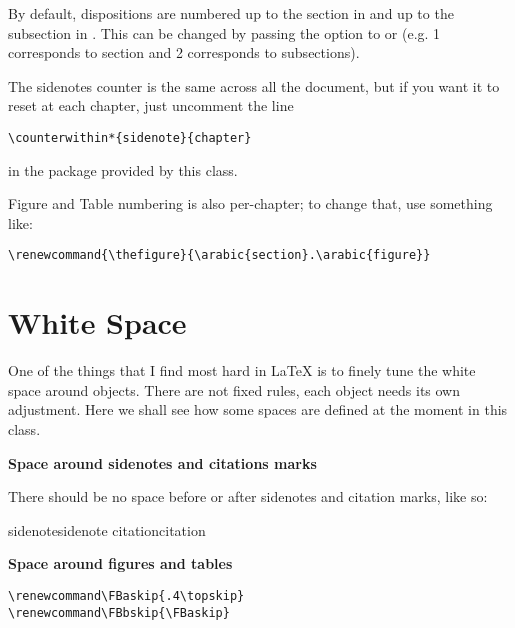 By default, dispositions are numbered up to the section in 
and up to the subsection in . This can be changed by
passing the option  to or
 (e.g. 1 corresponds to section and 2 corresponds to
subsections).

The sidenotes counter is the same across all the document, but if you 
want it to reset at each chapter, just uncomment the line

\begin{lstlisting}[style=kaolstplain]
\counterwithin*{sidenote}{chapter}
\end{lstlisting}

in the  package provided by this class.

Figure and Table numbering is also per-chapter; to change that, use 
something like:

\begin{lstlisting}[style=kaolstplain]
\renewcommand{\thefigure}{\arabic{section}.\arabic{figure}}
\end{lstlisting}

\section{White Space}

One of the things that I find most hard in \LaTeX\xspace is to finely 
tune the white space around objects. There are not fixed rules, each 
object needs its own adjustment. Here we shall see how some spaces are 
defined at the moment in this class.

\textbf{Space around sidenotes and citations marks}

There should be no space before or after sidenotes and citation marks, 
like so:

sidenotesidenote\newline
citation\cite{James2013}citation

\textbf{Space around figures and tables}

\begin{lstlisting}[style=kaolstplain]
\renewcommand\FBaskip{.4\topskip}
\renewcommand\FBbskip{\FBaskip}
\end{lstlisting}


